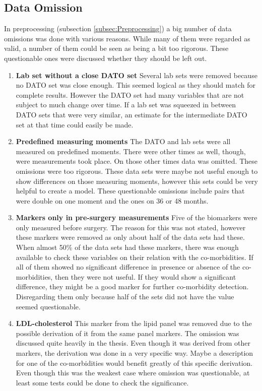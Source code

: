 \documentclass[10pt,a4paper]{article}
\begin{document}
	\subsection{Data Omission}
	
	In preprocessing (subsection \ref{subsec:Preprocessing}) a big number of data omissions was done with various reasons. While many of them were regarded as valid, a number of them could be seen as being a bit too rigorous. These questionable ones were discussed whether they should be left out.
	
	\begin{enumerate}
		\item \textbf{Lab set without a close DATO set} Several lab sets were removed because no DATO set was close enough. This seemed logical as they should match for complete results. However the DATO set had many variables that are not subject to much change over time. If a lab set was squeezed in between DATO sets that were very similar, an estimate for the intermediate DATO set at that time could easily be made.
		
		\item \textbf{Predefined measuring moments} The DATO and lab sets were all measured on predefined moments. There were other times as well, though, were measurements took place. On those other times data was omitted. These omissions were too rigorous. These data sets were maybe not useful enough to show differences on those measuring moments, however this sets could be very helpful to create a model. These questionable omissions include pairs that were double on one moment and the ones on 36 or 48 months. 
		
		\item \textbf{Markers only in pre-surgery measurements} Five of the biomarkers were only measured before surgery. The reason for this was not stated, however these markers were removed as only about half of the data sets had these. When almost 50\% of the data sets had these markers, there was enough available to check these variables on their relation with the co-morbidities. If all of them showed no significant difference in presence or absence of the co-morbidities, then they were not useful. If they would show a significant difference, they might be a good marker for further co-morbidity detection. Disregarding them only because half of the sets did not have the value seemed questionable.
		
		\item \textbf{LDL-cholesterol} This marker from the lipid panel was removed due to the possible derivation of it from the same panel markers. The omission was discussed quite heavily in the thesis. Even though it was derived from other markers, the derivation was done in a very specific way. Maybe a description for one of the co-morbidities would benefit greatly of this specific derivation. Even though this was the weakest case where omission was questionable, at least some tests could be done to check the significance.
		
	\end{enumerate}
	
\end{document}
